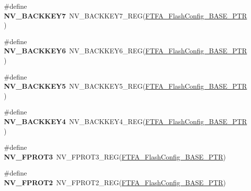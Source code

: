 \begin{DoxyCompactItemize}
\item 
\hypertarget{group___n_v___register___accessor___macros_gaf4c4eb8173a514a0fe632f29e80423d4}{}\#define {\bfseries N\+V\+\_\+\+B\+A\+C\+K\+K\+E\+Y7}~N\+V\+\_\+\+B\+A\+C\+K\+K\+E\+Y7\+\_\+\+R\+E\+G(\hyperlink{group___n_v___peripheral_ga3458652dfc38239f92682556e63596b5}{F\+T\+F\+A\+\_\+\+Flash\+Config\+\_\+\+B\+A\+S\+E\+\_\+\+P\+T\+R})\label{group___n_v___register___accessor___macros_gaf4c4eb8173a514a0fe632f29e80423d4}

\item 
\hypertarget{group___n_v___register___accessor___macros_ga74544d83ca29fc4d859726eb023dadb9}{}\#define {\bfseries N\+V\+\_\+\+B\+A\+C\+K\+K\+E\+Y6}~N\+V\+\_\+\+B\+A\+C\+K\+K\+E\+Y6\+\_\+\+R\+E\+G(\hyperlink{group___n_v___peripheral_ga3458652dfc38239f92682556e63596b5}{F\+T\+F\+A\+\_\+\+Flash\+Config\+\_\+\+B\+A\+S\+E\+\_\+\+P\+T\+R})\label{group___n_v___register___accessor___macros_ga74544d83ca29fc4d859726eb023dadb9}

\item 
\hypertarget{group___n_v___register___accessor___macros_ga7b8e49b6530c2192672343b7f32ae5e8}{}\#define {\bfseries N\+V\+\_\+\+B\+A\+C\+K\+K\+E\+Y5}~N\+V\+\_\+\+B\+A\+C\+K\+K\+E\+Y5\+\_\+\+R\+E\+G(\hyperlink{group___n_v___peripheral_ga3458652dfc38239f92682556e63596b5}{F\+T\+F\+A\+\_\+\+Flash\+Config\+\_\+\+B\+A\+S\+E\+\_\+\+P\+T\+R})\label{group___n_v___register___accessor___macros_ga7b8e49b6530c2192672343b7f32ae5e8}

\item 
\hypertarget{group___n_v___register___accessor___macros_ga5f7ba38a88074b8b658dfe992c73482c}{}\#define {\bfseries N\+V\+\_\+\+B\+A\+C\+K\+K\+E\+Y4}~N\+V\+\_\+\+B\+A\+C\+K\+K\+E\+Y4\+\_\+\+R\+E\+G(\hyperlink{group___n_v___peripheral_ga3458652dfc38239f92682556e63596b5}{F\+T\+F\+A\+\_\+\+Flash\+Config\+\_\+\+B\+A\+S\+E\+\_\+\+P\+T\+R})\label{group___n_v___register___accessor___macros_ga5f7ba38a88074b8b658dfe992c73482c}

\item 
\hypertarget{group___n_v___register___accessor___macros_ga04c3d23d8164e3fb7fb4f3e011869b5a}{}\#define {\bfseries N\+V\+\_\+\+F\+P\+R\+O\+T3}~N\+V\+\_\+\+F\+P\+R\+O\+T3\+\_\+\+R\+E\+G(\hyperlink{group___n_v___peripheral_ga3458652dfc38239f92682556e63596b5}{F\+T\+F\+A\+\_\+\+Flash\+Config\+\_\+\+B\+A\+S\+E\+\_\+\+P\+T\+R})\label{group___n_v___register___accessor___macros_ga04c3d23d8164e3fb7fb4f3e011869b5a}

\item 
\hypertarget{group___n_v___register___accessor___macros_gaedf00f22b7dabfa124aeb38cdd5fb8a8}{}\#define {\bfseries N\+V\+\_\+\+F\+P\+R\+O\+T2}~N\+V\+\_\+\+F\+P\+R\+O\+T2\+\_\+\+R\+E\+G(\hyperlink{group___n_v___peripheral_ga3458652dfc38239f92682556e63596b5}{F\+T\+F\+A\+\_\+\+Flash\+Config\+\_\+\+B\+A\+S\+E\+\_\+\+P\+T\+R})\label{group___n_v___register___accessor___macros_gaedf00f22b7dabfa124aeb38cdd5fb8a8}


\end{DoxyCompactItemize}
